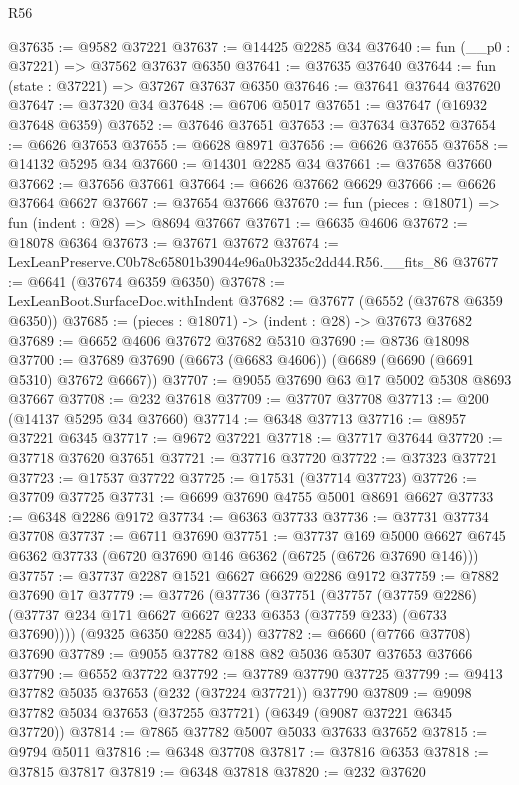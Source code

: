 \begin{lexlean}{R56}
\begin{coremodule}
@37635 := @9582 @37221
@37637 := @14425 @2285 @34
@37640 := fun (__p0 : @37221) => @37562 @37637 @6350
@37641 := @37635 @37640
@37644 := fun (state : @37221) => @37267 @37637 @6350
@37646 := @37641 @37644 @37620
@37647 := @37320 @34
@37648 := @6706 @5017
@37651 := @37647 (@16932 @37648 @6359)
@37652 := @37646 @37651
@37653 := @37634 @37652
@37654 := @6626 @37653
@37655 := @6628 @8971
@37656 := @6626 @37655
@37658 := @14132 @5295 @34
@37660 := @14301 @2285 @34
@37661 := @37658 @37660
@37662 := @37656 @37661
@37664 := @6626 @37662 @6629
@37666 := @6626 @37664 @6627
@37667 := @37654 @37666
@37670 := fun (pieces : @18071) => fun (indent : @28) => @8694 @37667
@37671 := @6635 @4606
@37672 := @18078 @6364
@37673 := @37671 @37672
@37674 := LexLeanPreserve.C0b78c65801b39044e96a0b3235c2dd44.R56.__fits_86
@37677 := @6641 (@37674 @6359 @6350)
@37678 := LexLeanBoot.SurfaceDoc.withIndent
@37682 := @37677 (@6552 (@37678 @6359 @6350))
@37685 := (pieces : @18071) -> (indent : @28) -> @37673 @37682
@37689 := @6652 @4606 @37672 @37682 @5310
@37690 := @8736 @18098
@37700 := @37689 @37690 (@6673 (@6683 @4606)) (@6689 (@6690 (@6691 @5310) @37672 @6667))
@37707 := @9055 @37690 @63 @17 @5002 @5308 @8693 @37667
@37708 := @232 @37618
@37709 := @37707 @37708
@37713 := @200 (@14137 @5295 @34 @37660)
@37714 := @6348 @37713
@37716 := @8957 @37221 @6345
@37717 := @9672 @37221
@37718 := @37717 @37644
@37720 := @37718 @37620 @37651
@37721 := @37716 @37720
@37722 := @37323 @37721
@37723 := @17537 @37722
@37725 := @17531 (@37714 @37723)
@37726 := @37709 @37725
@37731 := @6699 @37690 @4755 @5001 @8691 @6627
@37733 := @6348 @2286 @9172
@37734 := @6363 @37733
@37736 := @37731 @37734 @37708
@37737 := @6711 @37690
@37751 := @37737
    @169
    @5000
    @6627
    @6745
    @6362
    @37733
    (@6720 @37690 @146 @6362 (@6725 (@6726 @37690 @146)))
@37757 := @37737 @2287 @1521 @6627 @6629 @2286 @9172
@37759 := @7882 @37690 @17
@37779 := @37726
    (@37736
      (@37751
        (@37757
          (@37759 @2286)
          (@37737 @234 @171 @6627 @6627 @233 @6353 (@37759 @233) (@6733 @37690))))
      (@9325 @6350 @2285 @34))
@37782 := @6660 (@7766 @37708) @37690
@37789 := @9055 @37782 @188 @82 @5036 @5307 @37653 @37666
@37790 := @6552 @37722
@37792 := @37789 @37790 @37725
@37799 := @9413 @37782 @5035 @37653 (@232 (@37224 @37721)) @37790
@37809 := @9098 @37782 @5034 @37653 (@37255 @37721) (@6349 (@9087 @37221 @6345 @37720))
@37814 := @7865 @37782 @5007 @5033 @37633 @37652
@37815 := @9794 @5011
@37816 := @6348 @37708
@37817 := @37816 @6353
@37818 := @37815 @37817
@37819 := @6348 @37818
@37820 := @232 @37620

\end{coremodule}
\end{lexlean}
